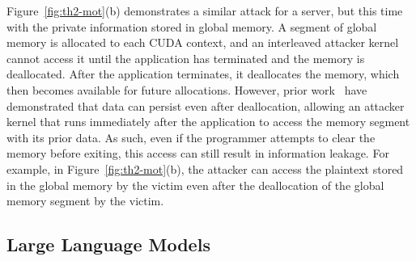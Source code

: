 Figure~\ref{fig:th2-mot}(b) demonstrates a similar attack for a  server, but this time with the private information stored in global memory.
%
A segment of global memory is allocated to each CUDA context,  and an interleaved attacker kernel cannot access it until the application has terminated and the memory is deallocated.
%
After the application terminates, it deallocates the memory,  which then becomes available for future allocations.
%
However, prior work~\cite{pietro2016TECS} have demonstrated that data can persist even after deallocation, allowing an attacker kernel that runs immediately after the application to access the memory segment with its prior data. 
%
As such, even if the programmer attempts to clear the memory before exiting, this access can still result in information leakage. 
%
For example, in Figure~\ref{fig:th2-mot}(b), the attacker can access the plaintext stored in the global memory by the victim even after the deallocation of the global memory segment by the victim.
\subsection{Large Language Models}
